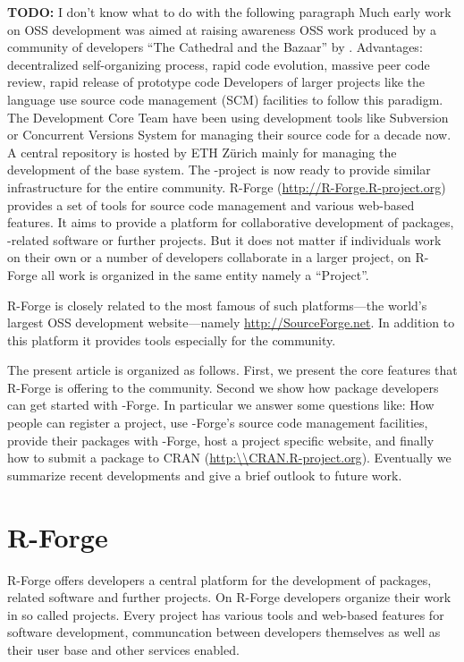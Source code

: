 \textbf{TODO: } I don't know what to do with the following paragraph
Much early work on OSS development was aimed at raising awareness  OSS
work produced by a community of developers ``The Cathedral and the
Bazaar'' by \cite{forge:Raymond:1999}.
Advantages:
decentralized self-organizing process, rapid code evolution, massive
peer code review, rapid release of prototype code
Developers of larger projects like the language \R{} use source code
management (SCM) facilities to follow this paradigm.
The \R{} Development Core Team have been using
development tools like Subversion \citep[SVN,
see][]{forge:Pilato+Collins-Sussman+Fitzpatrick:2004} or  
Concurrent Versions System \citep[CVS, see][]{forge:Cederqvist:2006}
for managing their source code for a decade now.  
A central repository is hosted by ETH Z\"urich mainly for
managing the development of the base \R{} system. The
\R{}-project is now ready to provide similar infrastructure
for the entire \R{} community.
R-Forge (\url{http://R-Forge.R-project.org}) provides a set of tools
for source code management and various web-based
features. It aims to provide a platform for collaborative development of
\R{} packages, \R{}-related software or further projects. But it does not
matter if individuals work on their own or a number of developers
collaborate in a larger project, on R-Forge all work is organized in
the same entity namely a ``Project''.

R-Forge is closely related to the most famous of such platforms---the
world's largest OSS development website---namely
\url{http://SourceForge.net}. In addition to this platform it provides
tools especially for the \R{} community.

The present article is organized as follows. First, we present the core
features that R-Forge is offering to the \R{} community. Second we
show how package developers can get started with 
\R{}-Forge. In particular we answer some questions like: How people can
register a project, use \R{}-Forge's source code management facilities, provide their
packages with \R{}-Forge, host a project specific website, and
finally how to submit a package to CRAN
(\url{http:\\CRAN.R-project.org}).
Eventually we summarize recent developments and give a brief outlook
to future work.

\section{R-Forge}
R-Forge offers developers a central platform for the development of \R{} packages, \R{}
related software and further projects. On R-Forge developers organize their work
in so called projects. Every project has various tools and web-based features
for software development, communcation between developers themselves
as well as their
user base and other services enabled.

